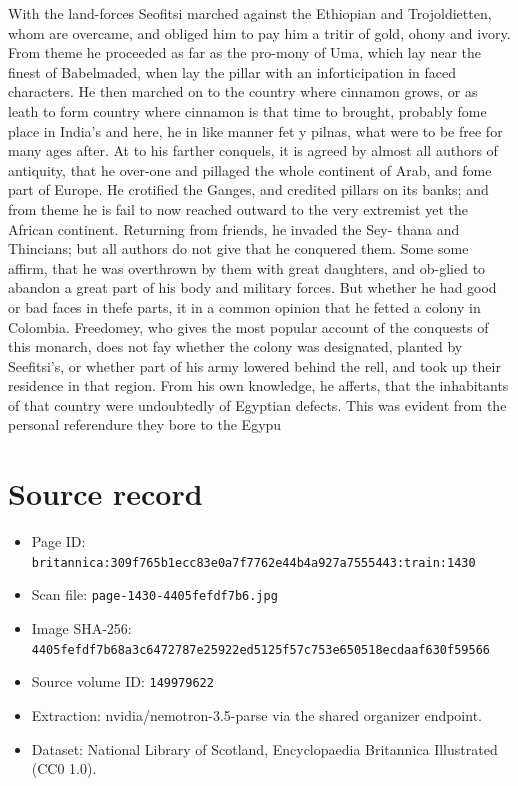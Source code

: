 \documentclass{article}
\begin{document}
With the land-forces Seofitsi marched against the Ethiopian and Trojoldietten, whom are overcame, and obliged him to pay him a tritir of gold, ohony and ivory. From theme he proceeded as far as the pro-mony of Uma, which lay near the finest of Babelmaded, when lay the pillar with an inforticipation in faced characters. He then marched on to the country where cinnamon grows, or as leath to form country where cinnamon is that time to brought, probably fome place in India’s and here, he in like manner fet y pilnas, what were to be free for many ages after. At to his farther conquels, it is agreed by almost all authors of antiquity, that he over-one and pillaged the whole continent of Arab, and fome part of Europe. He crotified the Ganges, and credited pillars on its banks; and from theme he is fail to now reached outward to the very extremist yet the African continent. Returning from friends, he invaded the Sey- thana and Thincians; but all authors do not give that he conquered them. Some some affirm, that he was overthrown by them with great daughters, and ob-glied to abandon a great part of his body and military forces. But whether he had good or bad faces in thefe parts, it in a common opinion that he fetted a colony in Colombia. Freedomey, who gives the most popular account of the conquests of this monarch, does not fay whether the colony was designated, planted by Seefitsi's, or whether part of his army lowered behind the rell, and took up their residence in that region. From his own knowledge, he afferts, that the inhabitants of that country were undoubtedly of Egyptian defects. This was evident from the personal referendure they bore to the Egypu

\section*{Source record}
\begin{itemize}
\item Page ID: \texttt{britannica:309f765b1ecc83e0a7f7762e44b4a927a7555443:train:1430}
\item Scan file: \texttt{page-1430-4405fefdf7b6.jpg}
\item Image SHA-256: \texttt{4405fefdf7b68a3c6472787e25922ed5125f57c753e650518ecdaaf630f59566}
\item Source volume ID: \texttt{149979622}
\item Extraction: nvidia/nemotron-3.5-parse via the shared organizer endpoint.
\item Dataset: National Library of Scotland, Encyclopaedia Britannica Illustrated (CC0 1.0).
\end{itemize}
\end{document}
